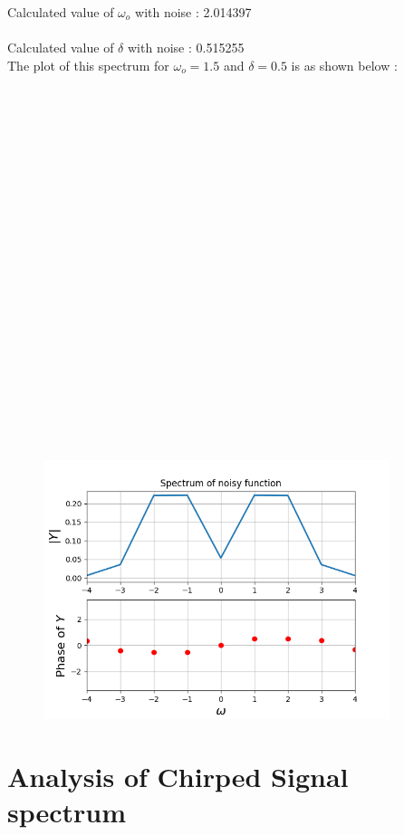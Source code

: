 \documentclass[10pt,a4paper]{article}
\begin{document}
Calculated value of $\omega_o$ with noise : 2.014397\\\\
  Calculated value of $\delta$ with noise       : 0.515255\\

The plot of this spectrum for $\omega_o = 1.5$ and $\delta = 0.5$ is as shown below : \\\\\\\\\\\\\\\\\\\\\\\\\\\\\\\\\\\\\\\\\\\\

\begin{figure}[!tbh]

\includegraphics[width = 0.9\textwidth]{4-spectrum of noisy cos cube(1.5t+0.5) with windowing.png}

\end{figure}

\section{Analysis of Chirped Signal spectrum}
\end{document}
